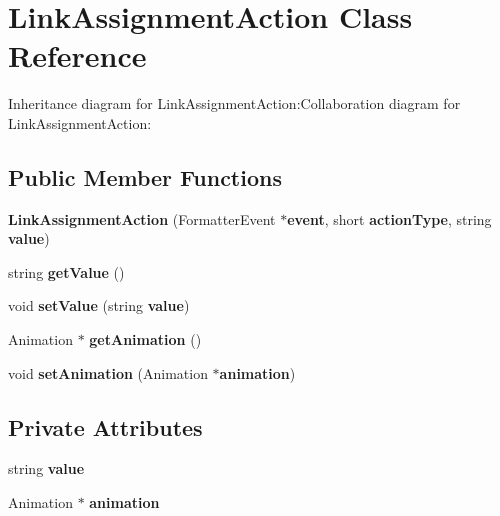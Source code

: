 \section{LinkAssignmentAction Class Reference}
\label{classbr_1_1pucrio_1_1telemidia_1_1ginga_1_1ncl_1_1model_1_1link_1_1LinkAssignmentAction}
Inheritance diagram for LinkAssignmentAction:Collaboration diagram for LinkAssignmentAction:\subsection*{Public Member Functions}
\begin{CompactItemize}
\item 
\textbf{LinkAssignmentAction} (FormatterEvent $\ast${\bf event}, short {\bf actionType}, string {\bf value})\label{classbr_1_1pucrio_1_1telemidia_1_1ginga_1_1ncl_1_1model_1_1link_1_1LinkAssignmentAction_a7d96996a002d0eaee94bfe021ddd61a}

\item 
string \textbf{getValue} ()\label{classbr_1_1pucrio_1_1telemidia_1_1ginga_1_1ncl_1_1model_1_1link_1_1LinkAssignmentAction_650fbea5b6e5402aba339bf785cf3cc4}

\item 
void \textbf{setValue} (string {\bf value})\label{classbr_1_1pucrio_1_1telemidia_1_1ginga_1_1ncl_1_1model_1_1link_1_1LinkAssignmentAction_64bb606b877f35bc52aaaab2ca270d7d}

\item 
Animation $\ast$ \textbf{getAnimation} ()\label{classbr_1_1pucrio_1_1telemidia_1_1ginga_1_1ncl_1_1model_1_1link_1_1LinkAssignmentAction_a266c4ff4bae25ed0cd1eb617b6b2d7e}

\item 
void \textbf{setAnimation} (Animation $\ast${\bf animation})\label{classbr_1_1pucrio_1_1telemidia_1_1ginga_1_1ncl_1_1model_1_1link_1_1LinkAssignmentAction_341d480212e85a17f0521c621a9a4f21}

\end{CompactItemize}
\subsection*{Private Attributes}
\begin{CompactItemize}
\item 
string {\bf value}\label{classbr_1_1pucrio_1_1telemidia_1_1ginga_1_1ncl_1_1model_1_1link_1_1LinkAssignmentAction_d9a5de78977ae9e5b497bf647d227aec}

\item 
Animation $\ast$ {\bf animation}\label{classbr_1_1pucrio_1_1telemidia_1_1ginga_1_1ncl_1_1model_1_1link_1_1LinkAssignmentAction_d970a0de1401aa016688839c1b3243be}

\end{CompactItemize}


